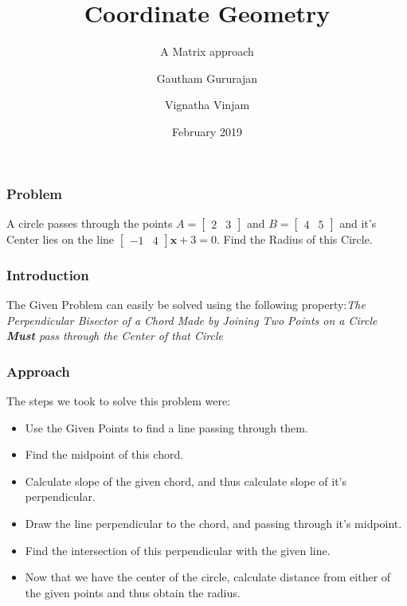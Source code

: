 \documentclass{beamer}
\title{Coordinate Geometry}
\subtitle{A Matrix approach}
\author{Gautham Gururajan \and Vignatha Vinjam}
\institute{Indian Institute of Technology Hyderabad}
\date{February 2019}
\begin{document}
 
\frame{\titlepage}
 
\begin{frame}
\frametitle{Problem}
A circle passes through the points $A = \begin{bmatrix} 2 & 3
\end{bmatrix}$ and $B = \begin{bmatrix} 4 & 5
\end{bmatrix}$
and it's Center lies on the line  
$ \begin{bmatrix}
-1 & 4
\end{bmatrix}\mathbf{x} + 3 = 0$.
\newline
\newline
\newline
Find the Radius of this Circle.

\end{frame}
\begin{frame}
\frametitle{Introduction}
The Given Problem can easily be solved using the following property:\newline \textit{The Perpendicular Bisector of a Chord Made by Joining Two Points on a Circle \textbf{\textit{Must}} pass through the Center of that Circle}
\end{frame}
\begin{frame}
\frametitle{Approach}
The steps we took to solve this problem were:
\begin{itemize}
 \item<1-> Use the Given Points to find a line passing through them.
 \item<2-> Find the midpoint of this chord.
 \item<3-> Calculate slope of the given chord, and thus calculate slope of it's perpendicular.
 \item<4-> Draw the line perpendicular to the chord, and passing through it's midpoint.
 \item<5-> Find the intersection of this perpendicular with the given line.
 \item<6-> Now that we have the center of the circle, calculate distance from either of the given points and thus obtain the radius.
\end{itemize}

\end{frame}
\end{document}
